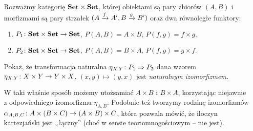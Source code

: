 \begin{exc}
  Rozważmy kategorię $\Set\times \Set$, której obiektami są pary zbiorów $(A, B)$ i morfizmami są pary strzałek $(\morpharr fA {A'}, \morpharr gB{B'})$ oraz dwa równoległe funktory:
  \begin{enumerate}
    \item $\morph {P_1}{\Set\times \Set}\Set$, $P(A, B)=A\times B$, $P(f, g) = f\times g$,
    \item $\morph {P_2}{\Set\times \Set}\Set$, $P(A, B)=B\times A$, $P(f, g) = g\times f$.
  \end{enumerate}
  Pokaż, że transformacja naturalna $\nattran{\eta_{X, Y}}{P_1}{P_2}$ dana wzorem $\morph{\eta_{X, Y}}{X\times Y}{Y\times X}$, $(x, y)\mapsto (y, x)$ jest \emph{naturalnym izomorfizmem}.

  W taki właśnie sposób możemy utożsamiać $A\times B$ i $B\times A$, korzystając niejawnie z odpowiedniego izomorfizmu $\eta_{A, B}$. Podobnie też tworzymy rodzinę izomorfizmów $\morph{\alpha_{A,B,C}}{A\times (B\times C)}{(A\times B)\times C}$, która pozwala mówić, że iloczyn kartezjański jest ,,łączny'' (choć w sensie teoriomnogościowym -- nie jest).
\end{exc}

